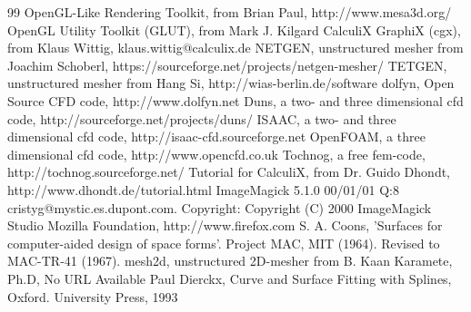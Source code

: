\documentclass{article}
\begin{document}
\begin{thebibliography}{99}
 OpenGL-Like Rendering Toolkit, from Brian Paul, http://www.mesa3d.org/ 
 OpenGL Utility Toolkit (GLUT), from Mark J. Kilgard
 CalculiX GraphiX (cgx), from Klaus Wittig, klaus.wittig@calculix.de
 NETGEN, unstructured mesher from Joachim Schoberl, https://sourceforge.net/projects/netgen-mesher/
 TETGEN, unstructured mesher from Hang Si, http://wias-berlin.de/software
 dolfyn, Open Source CFD code, http://www.dolfyn.net
 Duns, a two- and three dimensional cfd code, http://sourceforge.net/projects/duns/
 ISAAC, a two- and three dimensional cfd code, http://isaac-cfd.sourceforge.net
 OpenFOAM, a three dimensional cfd code, http://www.opencfd.co.uk
 Tochnog, a free fem-code, http://tochnog.sourceforge.net/
 Tutorial for CalculiX, from Dr. Guido Dhondt, http://www.dhondt.de/tutorial.html
 ImageMagick 5.1.0 00/01/01 Q:8 cristyg@mystic.es.dupont.com. Copyright: Copyright (C) 2000 ImageMagick Studio 
 Mozilla Foundation, http://www.firefox.com
 S. A. Coons, 'Surfaces for computer-aided design of space forms'. Project MAC, MIT (1964). Revised to MAC-TR-41 (1967). 
 mesh2d, unstructured 2D-mesher from B. Kaan Karamete, Ph.D, No URL Available
 Paul Dierckx, Curve and Surface Fitting with Splines, Oxford. University Press, 1993
\end{thebibliography}
\end{document}
